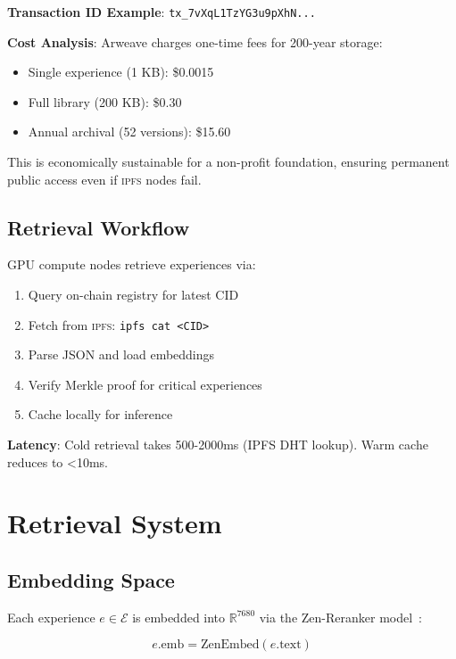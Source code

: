 \documentclass[11pt,letterpaper]{article}
\newcommand{\IPFS}{\textsc{ipfs}}
\begin{document}
\textbf{Transaction ID Example}: \texttt{tx\_7vXqL1TzYG3u9pXhN...}

\textbf{Cost Analysis}: Arweave charges one-time fees for 200-year storage:
\begin{itemize}
    \item Single experience (1 KB): \$0.0015
    \item Full library (200 KB): \$0.30
    \item Annual archival (52 versions): \$15.60
\end{itemize}

This is economically sustainable for a non-profit foundation, ensuring permanent public access even if \IPFS{} nodes fail.

\subsection{Retrieval Workflow}

GPU compute nodes retrieve experiences via:

\begin{enumerate}
    \item Query on-chain registry for latest CID
    \item Fetch from \IPFS{}: \texttt{ipfs cat <CID>}
    \item Parse JSON and load embeddings
    \item Verify Merkle proof for critical experiences
    \item Cache locally for inference
\end{enumerate}

\textbf{Latency}: Cold retrieval takes 500-2000ms (IPFS DHT lookup). Warm cache reduces to <10ms.

\section{Retrieval System}
\label{sec:retrieval}

\subsection{Embedding Space}

Each experience $e \in \mathcal{E}$ is embedded into $\mathbb{R}^{7680}$ via the Zen-Reranker model~\cite{zoo2025zen}:

\begin{equation}
e.\text{emb} = \text{ZenEmbed}(e.\text{text})
\end{equation}
\end{document}
